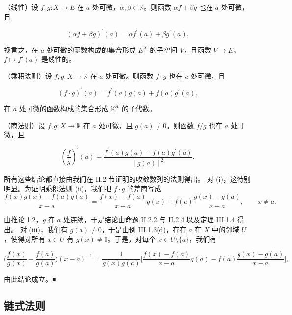 \begin{theorem}

\begin{subitems}
\item

（线性）设 $f, g: X \to E$ 在 $a$ 处可微，$\alpha, \beta \in \mathbb{K}$。则函数 $\alpha f + \beta g$ 也在 $a$ 处可微，且

\[
\left(\alpha f+\beta g\right)^{\prime}(a)=\alpha f^{\prime}(a)+\beta g^{\prime}(a).
\]

换言之，在 $a$ 处可微的函数构成的集合形成 $E^X$ 的子空间 $V$，且函数 $V \to E$，$f \mapsto f'(a)$ 是线性的。

\item

（乘积法则）设 $ f, g: X \to \mathbb{K} $ 在 $ a $ 处可微。则函数 $ f \cdot g $ 也在 $ a $ 处可微，且

\[
(f\cdot g)^{\prime}(a)=f^{\prime}(a)g(a)+f(a)g^{\prime}(a).
\]

在 $a$ 处可微的函数构成的集合形成 $\mathbb{K}^{X}$ 的子代数。

\item

（商法则）设 $ f, g: X \to \mathbb{K} $ 在 $ a $ 处可微，且 $ g(a) \neq 0 $。则函数 $ f/g $ 也在 $ a $ 处可微，且

\[
\left(\frac{f}{g}\right)^{\prime}(a)=\frac{f^{\prime}(a)g(a)-f(a)g^{\prime}(a)}{\left[g(a)\right]^{2}}.
\]

\proofhead
所有这些结论都直接由我们在 II.2 节证明的收敛数列的法则得出。
对 (i)，这特别明显。为证明乘积法则 (ii)，我们把 $ f \cdot g $ 的差商写成
\[
\frac{f(x)g(x)-f(a)g(a)}{x-a}=\frac{f(x)-f(a)}{x-a}g(x)+f(a)\frac{g(x)-g(a)}{x-a},\qquad x\neq a.
\]

由推论 1.2，$g$ 在 $a$ 处连续，于是结论由命题 II.2.2 与 II.2.4 以及定理 III.1.4 得出。
对 (iii)，我们有 $ g(a) \neq 0 $，于是由例 III.1.3(d)，存在 $ a $ 在 $ X $ 中的邻域 $ U $，使得对所有 $ x \in U $ 有 $ g(x) \neq 0 $。于是，对每个 $ x \in U \setminus \{a\} $，我们有

\[
\Big(\frac{f(x)}{g(x)}-\frac{f(a)}{g(a)}\Big)(x-a)^{-1}=\frac{1}{g(x)g(a)}\Big[\frac{f(x)-f(a)}{x-a}g(a)-f(a)\frac{g(x)-g(a)}{x-a}\Big],
\]

由此结论成立。■

\end{subitems}

\end{theorem}

\subsection*{链式法则}

